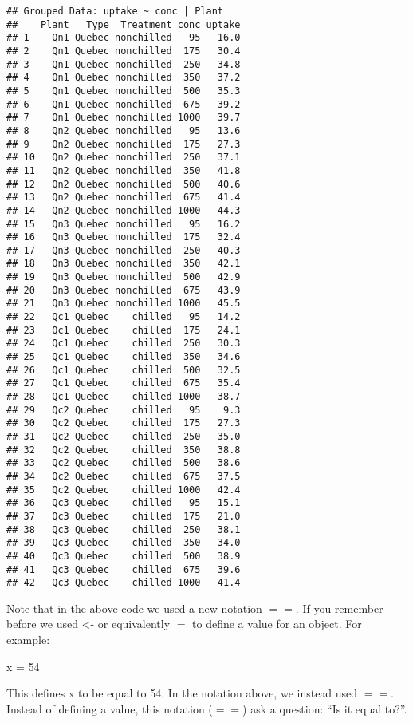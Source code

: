 \documentclass[]{article}
\newenvironment{Shaded}{\begin{snugshade}}{\end{snugshade}}
\newcommand{\DecValTok}[1]{\textcolor[rgb]{0.00,0.00,0.81}{#1}}
\newcommand{\NormalTok}[1]{#1}
\newcommand{\StringTok}[1]{\textcolor[rgb]{0.31,0.60,0.02}{#1}}
\begin{document}
\begin{verbatim}
## Grouped Data: uptake ~ conc | Plant
##    Plant   Type  Treatment conc uptake
## 1    Qn1 Quebec nonchilled   95   16.0
## 2    Qn1 Quebec nonchilled  175   30.4
## 3    Qn1 Quebec nonchilled  250   34.8
## 4    Qn1 Quebec nonchilled  350   37.2
## 5    Qn1 Quebec nonchilled  500   35.3
## 6    Qn1 Quebec nonchilled  675   39.2
## 7    Qn1 Quebec nonchilled 1000   39.7
## 8    Qn2 Quebec nonchilled   95   13.6
## 9    Qn2 Quebec nonchilled  175   27.3
## 10   Qn2 Quebec nonchilled  250   37.1
## 11   Qn2 Quebec nonchilled  350   41.8
## 12   Qn2 Quebec nonchilled  500   40.6
## 13   Qn2 Quebec nonchilled  675   41.4
## 14   Qn2 Quebec nonchilled 1000   44.3
## 15   Qn3 Quebec nonchilled   95   16.2
## 16   Qn3 Quebec nonchilled  175   32.4
## 17   Qn3 Quebec nonchilled  250   40.3
## 18   Qn3 Quebec nonchilled  350   42.1
## 19   Qn3 Quebec nonchilled  500   42.9
## 20   Qn3 Quebec nonchilled  675   43.9
## 21   Qn3 Quebec nonchilled 1000   45.5
## 22   Qc1 Quebec    chilled   95   14.2
## 23   Qc1 Quebec    chilled  175   24.1
## 24   Qc1 Quebec    chilled  250   30.3
## 25   Qc1 Quebec    chilled  350   34.6
## 26   Qc1 Quebec    chilled  500   32.5
## 27   Qc1 Quebec    chilled  675   35.4
## 28   Qc1 Quebec    chilled 1000   38.7
## 29   Qc2 Quebec    chilled   95    9.3
## 30   Qc2 Quebec    chilled  175   27.3
## 31   Qc2 Quebec    chilled  250   35.0
## 32   Qc2 Quebec    chilled  350   38.8
## 33   Qc2 Quebec    chilled  500   38.6
## 34   Qc2 Quebec    chilled  675   37.5
## 35   Qc2 Quebec    chilled 1000   42.4
## 36   Qc3 Quebec    chilled   95   15.1
## 37   Qc3 Quebec    chilled  175   21.0
## 38   Qc3 Quebec    chilled  250   38.1
## 39   Qc3 Quebec    chilled  350   34.0
## 40   Qc3 Quebec    chilled  500   38.9
## 41   Qc3 Quebec    chilled  675   39.6
## 42   Qc3 Quebec    chilled 1000   41.4
\end{verbatim}

Note that in the above code we used a new notation \(==\). If you
remember before we used \textless{}- or equivalently \(=\) to define a
value for an object. For example:

\begin{Shaded}
\begin{Highlighting}[]
\NormalTok{x =}\StringTok{ }\DecValTok{54}
\end{Highlighting}
\end{Shaded}

This defines x to be equal to 54. In the notation above, we instead used
\(==\). Instead of defining a value, this notation (\(==\)) ask a
question: ``Is it equal to?''.
\end{document}
